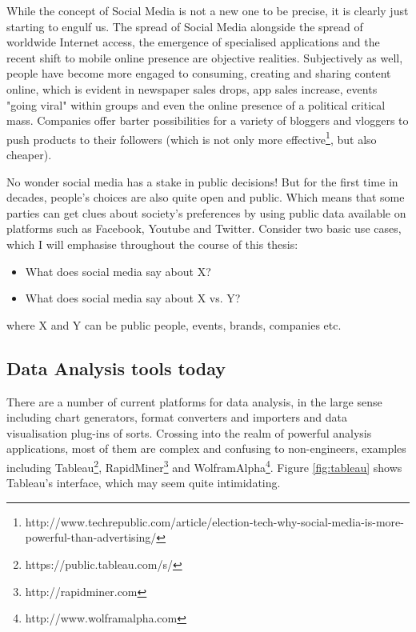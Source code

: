 While the concept of Social Media is not a new one to be precise, it is clearly just starting to engulf us. The spread of Social Media alongside the spread of worldwide Internet access, the emergence of specialised applications and the recent shift to mobile online presence are objective realities. Subjectively as well, people have become more engaged to consuming, creating and sharing content online, which is evident in newspaper sales drops, app sales increase, events "going viral" within groups and even the online presence of a political critical mass. Companies offer barter possibilities for a variety of bloggers and vloggers to push products to their followers (which is not only more effective\footnote{http://www.techrepublic.com/article/election-tech-why-social-media-is-more-powerful-than-advertising/}, but also cheaper).

No wonder social media has a stake in public decisions! But for the first time in decades, people's choices are also quite open and public. Which means that some parties can get clues about society's preferences by using public data available on platforms such as Facebook, Youtube and Twitter. Consider two basic use cases, which I will emphasise throughout the course of this thesis:

\begin{itemize}
\item What does social media say about X?
\item What does social media say about X vs. Y?
\end{itemize}

where X and Y can be public people, events, brands, companies etc. 

\subsection{Data Analysis tools today}

There are a number of current platforms for data analysis, in the large sense including chart generators, format converters and importers and data visualisation plug-ins of sorts. Crossing into the realm of powerful analysis applications, most of them are complex and confusing to non-engineers, examples including Tableau\footnote{https://public.tableau.com/s/}, RapidMiner\footnote{http://rapidminer.com} and WolframAlpha\footnote{http://www.wolframalpha.com}. Figure \ref{fig:tableau} shows Tableau's interface, which may seem quite intimidating.

